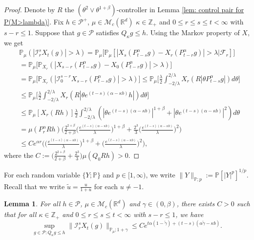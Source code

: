 \documentclass[12pt,a4paper]{amsart}
\theoremstyle{plain}
\newtheorem{lem}[thm]{Lemma}
\theoremstyle{definition}
\numberwithin{equation}{section}
\begin{document}
\begin{proof}
  Denote by $R$ the $(\theta^2\vee\theta^{1+\beta})$-controller in Lemma \ref{lem: control pair for P(M>lambda)}.
  Fix $h \in \mathcal P^+$, $\mu \in \mathcal M_c(\mathbb R^d)$ $\kappa \in \mathbb Z_+ $ and $0\leq r\leq s\leq t < \infty$ with $s-r \leq 1$.
  Suppose that $g\in \mathcal P$ satisfies $Q_\kappa g \leq h$.
  Using the Markov property of $X$, we get
  \begin{align}
   & \mathbb P_{\mu}(|\mathcal I_r^sX_t(g)|>\lambda)
      = \mathbb P_\mu \Big[\mathbb P_\mu [| X_{s}(P_{t-s}^\alpha g) -  X_{r}(P_{t-r}^\alpha g)|> \lambda | \mathscr F_r ]\Big] \\
     & = \mathbb P_\mu \big[\mathbb P_{X_r}(| X_{s-r}(P_{t-s}^\alpha g) -  X_{0}(P_{t-r}^\alpha g)|> \lambda)\big] \\
    & = \mathbb P_\mu \big[\mathbb P_{X_r}(|\mathcal I_0^{s-r} X_{s-r}( P_{t-s}^\alpha g) |> \lambda)\big]
      \leq \mathbb P_\mu \Big[ \frac{\lambda}{2}\int_{-2/\lambda}^{2/\lambda}X_r(R|\theta P^\alpha_{t-s}g|) d\theta \Big] \\
     & \leq \mathbb P_\mu \Big[ \frac{\lambda}{2}\int_{-2/\lambda}^{2/\lambda}X_r(R|\theta e^{(t-s)(\alpha- \kappa b)}h|) d\theta \Big] \\
     & \leq \mathbb P_\mu [X_r(Rh) ]
\frac{\lambda}{2}\int_{-2/\lambda}^{2/\lambda}(|\theta e^{(t-s)(\alpha- \kappa b)}|^{1+\beta} + |\theta e^{(t-s)(\alpha- \kappa b)}|^{2})d\theta
     \\ & =  \mu(P_r^\alpha Rh)
\Big(  \frac{2^{2+\beta}}{2+\beta}\Big(\frac{e^{(t-s)(\alpha- \kappa b)}}{\lambda}\Big)^{1+\beta} + \frac{2^{3}}{3}\Big(\frac{e^{(t-s)(\alpha- \kappa b)}}{\lambda}\Big)^2\Big)
    \\ & \leq C e^{\alpha r} \Big(\Big( \frac{e^{(t-s)(\alpha - \kappa b)}}{\lambda}\Big)^{1+\beta} + \Big( \frac{e^{(t-s)(\alpha - \kappa b)}}{\lambda}\Big)^{2} \Big),
  \end{align}
  where the $C := \Big(\frac{2^{2+\beta}}{2+\beta} + \frac{2^{3}}{3} \Big) \mu(Q_0Rh)>0$.
\end{proof}

For each random variable $\{Y; \mathbb P\}$ and $p \in [1,\infty)$, we write $ \|Y\|_{\mathbb P;p} := \mathbb P[|Y|^p]^{1/p}$.
Recall that we write $\tilde u = \frac{u}{1+u}$ for each $u\neq -1$.
\begin{lem}
  \label{lem: control of mgtrs}
  For all $h \in \mathcal P$, $\mu \in \mathcal M_c(\mathbb R^d)$ and $\gamma\in (0, \beta)$, there exists $C > 0$ such that for all $\kappa \in \mathbb Z_+$ and $0\leq r \leq s\leq t<\infty$ with $s-r \leq 1$, we have
  \[
     \sup_{g \in \mathcal P: Q_\kappa g \leq h} \|\mathcal I_r^s X_t(g) \|_{\mathbb P_\mu;1+\gamma}
    \leq C e^{t\alpha (1- \tilde \gamma)+(t-s) (\alpha \tilde \gamma - \kappa b)}.
  \]
\end{lem}
\end{document}
